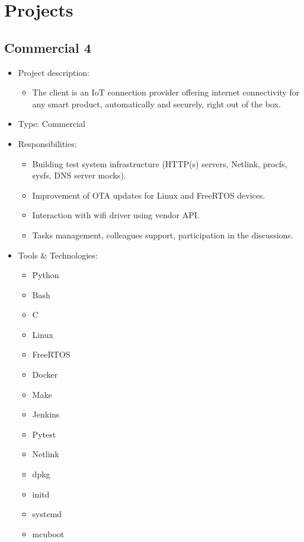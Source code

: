 \section{Projects}

\hypertarget{proj_com4}{\subsection{Commercial 4}}
\begin{itemize}
    \item Project description:
    \begin{itemize}
        \item The client is an IoT connection provider offering internet connectivity for any smart product,
              automatically and securely, right out of the box.
    \end{itemize}
    \item Type: Commercial
    \item Responsibilities:
    \begin{itemize}
        \item Building test system infrastructure
              (HTTP(s) servers, Netlink, procfs, sysfs, DNS server mocks).
        \item Improvement of OTA updates for Linux and FreeRTOS devices.
        \item Interaction with wifi driver using vendor API.
        \item Tasks management, colleagues support, participation in the discussions.
    \end{itemize}
    \item Tools \& Technologies:
    \begin{itemize}
        \item Python
        \item Bash
        \item C
        \item Linux
        \item FreeRTOS
        \item Docker
        \item Make
        \item Jenkins
        \item Pytest
        \item Netlink
        \item dpkg
        \item initd
        \item systemd
        \item mcuboot
    \end{itemize}
\end{itemize}
\newpage

